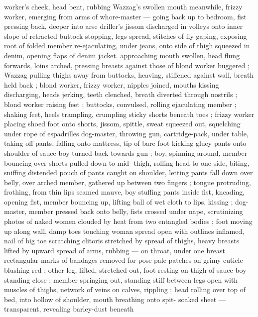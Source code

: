 worker's cheek, head bent, rubbing Wazzag's swollen mouth 
meanwhile, frizzy worker, emerging from arms of whore-master --- 
going back up to bedroom, fist pressing back, deeper into arse 
driller's jissom discharged in volleys onto inner slope of retracted 
buttock {\dashcom} stopping, legs spread, stitches of fly gaping, exposing 
root of folded member re-ejaculating, under jeans, onto side of thigh 
squeezed in denim, opening flaps of denim jacket. approaching 
mouth swollen, head flung forwards, loins arched, pressing breasts 
against those of blond worker buggered ; Wazzag pulling thighs 
away from buttocks, heaving, stiffened against wall, breath held back 
; blond worker, frizzy worker, nipples joined, mouths kissing 
discharging, heads jerking, teeth clenched, breath diverted through 
nostrils ; blond worker raising feet ; buttocks, convulsed, rolling 
ejaculating member ; shaking feet, heels trampling, crumpling sticky 
shorts beneath toes ; frizzy worker placing shoed foot onto shorts, 
jissom, spittle, sweat squeezed out, squelching under rope of 
espadrilles {\semislash} dog-master, throwing gun, cartridge-pack, under table, 
taking off pants, falling onto mattress, tip of bare foot kicking gluey 
pants onto shoulder of sauce-boy turned back towards gun ; boy, 
spinning around, member bouncing over shorts pulled down to mid- 
thigh, rolling head to one side, biting, sniffing distended pouch of 
pants caught on shoulder, letting pants fall down over belly, over 
arched member, gathered up between two fingers ; tongue 
protruding, frothing, from thin lips seamed mauve, boy stuffing pants 
inside fist, kneading, opening fist, member bouncing up, lifting ball 
of wet cloth to lips, kissing ; dog-master, member pressed back onto 
belly, fists crossed under nape, scrutinizing photos of naked women 
clouded by heat from two entangled bodies ; foot moving up along 
wall, damp toes touching woman spread open with outlines inflamed, 
nail of big toe scratching clitoris stretched by spread of thighs, 
heavy breasts lifted by upward spread of arms, rubbing --- on throat, 
under one breast {\dashcom} rectangular marks of bandages removed for 
pose {\col} pale patches on grimy cuticle blushing red ; other leg, lifted, 
stretched out, foot resting on thigh of sauce-boy standing close ; 
member springing out, standing stiff between legs open with 
muscles of thighs, network of veins on calves, rippling ; head rolling 
over top of bed, into hollow of shoulder, mouth breathing onto spit- 
soaked sheet --- transparent, revealing barley-dust beneath {\dashcom}
